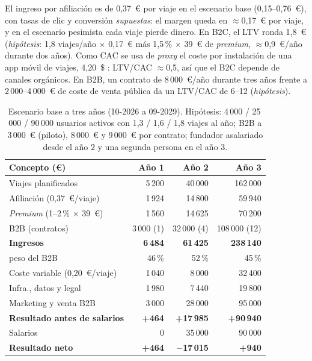 El ingreso por afiliación es de 0,37~€ por viaje en el escenario base (0,15--0,76~€), con tasas
de clic y conversión \emph{supuestas}: el margen queda en $\approx$0,17~€ por viaje, y en el
escenario pesimista cada viaje pierde dinero. En B2C, el LTV ronda 1,8~€ (\emph{hipótesis}:
1,8 viajes/año $\times$ 0,17~€ más 1,5\,\% $\times$ 39~€ de \emph{premium}, $\approx$0,9~€/año
durante dos años). Como CAC se usa de \emph{proxy} el coste por instalación de una app móvil de
viajes, 4,20~\$ \cite{mk:cac}: LTV/CAC $\approx$0,5, así que el B2C depende de canales orgánicos. En B2B, un
contrato de 8\,000~€/año durante tres años frente a 2\,000--4\,000~€ de coste de venta pública da
un LTV/CAC de 6--12 (\emph{hipótesis}).

\begin{table}[tb]\centering\footnotesize
\begin{tabularx}{\columnwidth}{@{}Yrrr@{}}\toprule
Concepto (€) & Año 1 & Año 2 & Año 3 \\\midrule
Viajes planificados & 5\,200 & 40\,000 & 162\,000 \\
Afiliación (0,37~€/viaje) & 1\,924 & 14\,800 & 59\,940 \\
\emph{Premium} (1--2\,\% $\times$ 39~€) & 1\,560 & 14\,625 & 70\,200 \\
B2B (contratos) & 3\,000 (1) & 32\,000 (4) & 108\,000 (12) \\
\textbf{Ingresos} & \textbf{6\,484} & \textbf{61\,425} & \textbf{238\,140} \\
\quad peso del B2B & 46\,\% & 52\,\% & 45\,\% \\\midrule
Coste variable (0,20~€/viaje) & 1\,040 & 8\,000 & 32\,400 \\
Infra., datos y legal & 1\,980 & 7\,440 & 19\,800 \\
Marketing y venta B2B & 3\,000 & 28\,000 & 95\,000 \\
\textbf{Resultado antes de salarios} & \textbf{+464} & \textbf{+17\,985} & \textbf{+90\,940} \\
Salarios & 0 & 35\,000 & 90\,000 \\
\textbf{Resultado neto} & \textbf{+464} & \textbf{$-$17\,015} & \textbf{+940} \\\bottomrule
\end{tabularx}
\caption{Escenario base a tres años (10-2026 a 09-2029). Hipótesis: 4\,000 / 25\,000 / 90\,000
usuarios activos con 1,3 / 1,6 / 1,8 viajes al año; B2B a 3\,000~€ (piloto), 8\,000~€ y
9\,000~€ por contrato; fundador asalariado desde el año 2 y una segunda persona en el año 3.}
\label{tab:03-escenario}
\end{table}

